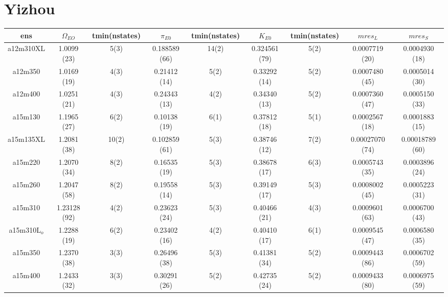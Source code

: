\documentclass{article}
\begin{document}
\clearpage
 \section*{Yizhou}
 \begin{table}[h!]
  \centering
 \setlength{\arrayrulewidth}{0.5mm}
\setlength{\tabcolsep}{13pt}
\renewcommand{\arraystretch}{2}
 \begin{tabular}{|| c |c | c | c | c | c | c | c | c ||} 
 \hline
 ens &  $\Omega_{EO}$ & tmin(nstates) & $\pi_{E0}$  & tmin(nstates)& $K_{E0}$  & tmin(nstates) & $mres_{L}$ & $mres_{S}$\\ [0.8ex] 
 \hline\hline
 a12m310XL 
 & {1.0099 (23)}   &   {5(3)} & { 0.188589 (66)}   & {14(2)}   & {0.324561 (79)}  & {5(2)}   & {0.0007719 (20)}  & { 0.0004930 (18)} \\ 
 \hline
 a12m350 
 & { 1.0169 (19)}   &   {4(3)} & {0.21412 (14)}   & {5(2)}   & {0.33292 (14)}  & {5(2)}   & {0.0007480 (45)}  & {0.0005014 (30)}  \\
 \hline
 a12m400 
  & {1.0251 (21)}   &   {4(3)} & {0.24343 (13)}   & {4(2)}   & {0.34340 (13)}  & {5(2)}   & { 0.0007360 (47)}  & { 0.0005150 (33)}  \\
 \hline
 a15m130
  & {1.1965 (27)}   &   {6(2)} & {0.10138 (19)}   & {6(1)}   & { 0.37812 (18)}  & {5(1)}   & {0.0002567 (18)}  & {0.0001883 (15)}   \\
 \hline
 a15m135XL 
 & { 1.2081 (38)}   &   {10(2)} & {0.102859 (61)}   & {5(3)}   & {0.38746 (12)}  & {7(2)}   & {0.00027070 (74)}  & {0.00018789 (60)} \\
 \hline
 a15m220
  & {1.2070 (34)}   &   {8(2)} & {0.16535 (19)}   & {5(3)}   & { 0.38678 (17)}  & {6(3)}   & { 0.0005743 (35)}  & {0.0003896 (24)} \\
 \hline
 a15m260
  & { 1.2047 (58)}   &   {8(2)} & {0.19558 (14)}   & {5(3)}   & {0.39149 (17)}  & {5(3)}   & {0.0008002 (45)}  & {0.0005223 (31)} \\
 \hline
 a15m310 
  & { 1.23128 (92)}   &   {4(2)} & {0.23623 (24)}  & {5(3)}   & {0.40466 (21)}  & {4(3)}   & {0.0009601 (63)}  & { 0.0006700 (43)} \\
 \hline
 a15m310L$_o$ 
  & {1.2288 (19)}   &   {6(2)} & { 0.23402 (16)}   & {4(2)}   & { 0.40410 (17)}   & {6(1)}  & {0.0009545 (47)}  & {  0.0006580 (35)}\\
 \hline
 a15m350 
  & { 1.2370 (38)}   &   {3(3)} & {0.26496 (38)}   & {5(3)}   & { 0.41381 (34)}  & {5(2)}  & {0.0009443 (86)}  & {0.0006702 (59)} \\
 \hline
  a15m400 
  & {1.2433 (32)}   &   {3(3)} & { 0.30291 (26)}   & {5(2)}   & { 0.42735 (24)}  & {5(2)}  & {0.0009433 (80)}  & {0.0006975 (59)} \\
  \hline
 
 \end{tabular}
\end{table}
\end{document}
